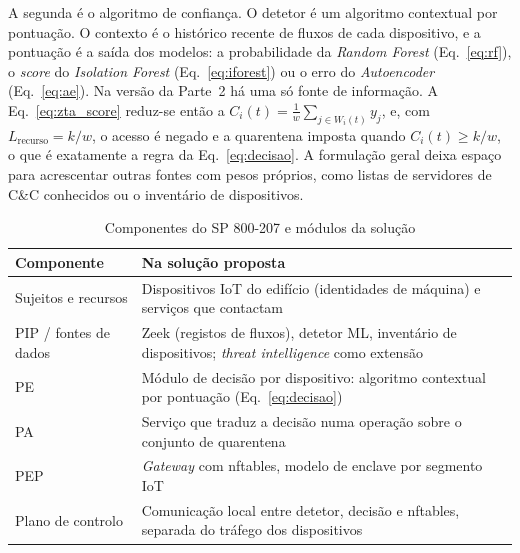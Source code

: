 \documentclass[conference,a4paper]{IEEEtran}
\begin{document}
A segunda é o algoritmo de confiança. O detetor é um algoritmo contextual por
pontuação. O contexto é o histórico recente de fluxos de cada dispositivo, e a
pontuação é a saída dos modelos: a probabilidade da \textit{Random Forest}
(Eq.~\ref{eq:rf}), o \textit{score} do \textit{Isolation Forest} (Eq.~\ref{eq:iforest})
ou o erro do \textit{Autoencoder} (Eq.~\ref{eq:ae}). Na versão da Parte~2 há uma só fonte
de informação. A Eq.~\ref{eq:zta_score} reduz-se então a $C_i(t)=\frac{1}{w}\sum_{j\in
W_i(t)} y_j$, e, com $L_{\text{recurso}} = k/w$, o acesso é negado e a quarentena imposta quando
$C_i(t) \ge k/w$, o que é exatamente a
regra da Eq.~\ref{eq:decisao}. A formulação geral deixa espaço para acrescentar outras
fontes com pesos próprios, como listas de servidores de C\&C conhecidos ou o inventário
de dispositivos.

\begin{table}[H]
\caption{Componentes do SP 800-207 e módulos da solução}\label{tab:zta_componentes}
\centering\footnotesize
\begin{tabular}{@{}p{}p{}@{}}
\toprule
Componente & Na solução proposta \\
\midrule
Sujeitos e recursos & Dispositivos IoT do edifício (identidades de máquina) e serviços que contactam \\
PIP / fontes de dados & Zeek (registos de fluxos), detetor ML, inventário de dispositivos; \textit{threat intelligence} como extensão \\
PE & Módulo de decisão por dispositivo: algoritmo contextual por pontuação (Eq.~\ref{eq:decisao}) \\
PA & Serviço que traduz a decisão numa operação sobre o conjunto de quarentena \\
PEP & \textit{Gateway} com nftables, modelo de enclave por segmento IoT \\
Plano de controlo & Comunicação local entre detetor, decisão e nftables, separada do tráfego dos dispositivos \\
\bottomrule
\end{tabular}
\end{table}
\end{document}
